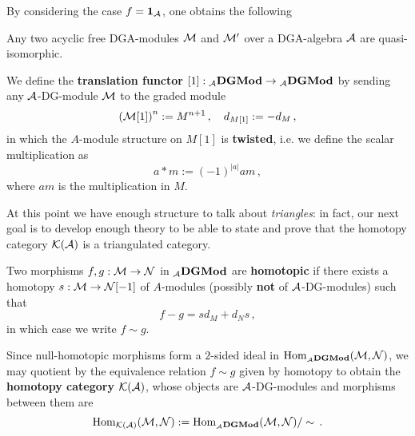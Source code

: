 	By considering the case $f={\normalfont\textbf{1}}_{\mathcal{A}}$, one obtains the following
	\begin{cor}
		Any two acyclic free DGA-modules $\mathcal{M}$ and $\mathcal{M}'$ over a DGA-algebra $\mathcal{A}$
		are quasi-isomorphic.
	\end{cor}
	
	\begin{df}
		We define the \textbf{translation functor} 
		$[1] : {}_{\mathcal{A}}{\normalfont\textbf{DGMod}} \to {}_{\mathcal{A}}{\normalfont\textbf{DGMod}}$
		by sending any $\mathcal{A}$-DG-module $\mathcal{M}$ to the graded module
		\begin{equation*}
			\left( \mathcal{M}[1] \right)^{n} := M^{n+1}\,,
			\quad d_{M[1]} := -d_{M}\,,
		\end{equation*}
		in which the $A$-module structure on $M[1]$ is \textbf{twisted},
		i.e. we define the scalar multiplication as
		\begin{equation*}
			a \ast m := (-1)^{|a|} am\,,
		\end{equation*}
		where $am$ is the multiplication in $M$.
	\end{df}
	
	
	At this point we have enough structure to talk about \emph{triangles}:
	in fact, our next goal is to develop enough theory to be able
	to state and prove that the homotopy category $\mathcal{K}(\mathcal{A})$
	is a triangulated category.
	
	
	\begin{df}
		Two morphisms $f,g: \mathcal{M} \to \mathcal{N}$ in ${}_{\mathcal{A}}{\normalfont\textbf{DGMod}}$
		are \textbf{homotopic} if there exists a homotopy
		$s:\mathcal{M} \to \mathcal{N}[-1]$ of $A$-modules (possibly \textbf{not} of $\mathcal{A}$-DG-modules)
		such that $$f-g=sd_{M} + d_{N}s\,,$$
		in which case we write $f \sim g$.
	\end{df}
	
	Since null-homotopic morphisms form a $2$-sided ideal in 
	$\operatorname{Hom}_{{}_{\mathcal{A}}{\normalfont\textbf{DGMod}}}(\mathcal{M},\mathcal{N})$, we may quotient
	by the equivalence relation $f \sim g$ given by homotopy
	to obtain the \textbf{homotopy category} $\mathcal{K}(\mathcal{A})$,
	whose objects are $\mathcal{A}$-DG-modules and morphisms between them are
	\begin{equation*}
		\operatorname{Hom}_{\mathcal{K}(\mathcal{A})}(\mathcal{M},\mathcal{N}) := \operatorname{Hom}_{{}_{\mathcal{A}}{\normalfont\textbf{DGMod}}}(\mathcal{M},\mathcal{N})/\sim\,.
	\end{equation*}
	
